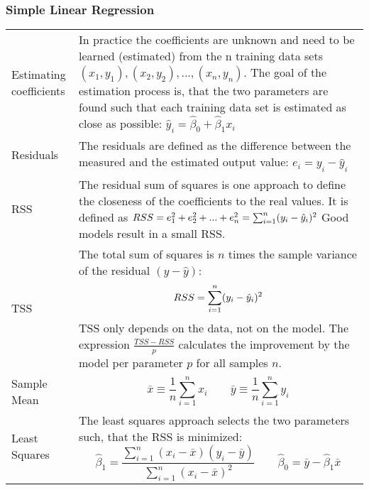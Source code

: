\subsubsection{Simple Linear Regression}
\begin{onehalfspace}
	\begin{tabularx}{\textwidth}{p{3cm}X}
		Estimating coefficients & In practice the coefficients are unknown and need to be learned (estimated) from the n training data sets \( (x_1,y_1), (x_2,y_2),..., (x_n,y_n) \). The goal of the estimation process is, that the two parameters are found such that each training data set is estimated as close as possible:
		\( \hat{y}_i = \hat{\beta}_0+\hat{\beta}_1 x_i \) \\
		Residuals & The residuals are defined as the difference between the measured and the estimated output value:
		\( e_i = y_i-\hat{y}_i \) \\
		RSS & The residual sum of squares is one approach to define the closeness of the coefficients to the real values. It	is defined as \( RSS = e^2_1+e^2_2+...+e^2_n = \sum_{i=1}^{n} (y_i-\hat{y}_i)^2\)
		Good models result in a small RSS. \\
		TSS & The total sum of squares is $n$ times the sample variance of the residual $(y-\hat{y})$:
		\[ RSS=\sum_{i=1}^{n} (y_i-\hat{y}_i)^2 \] TSS only depends on the data, not on the model.
		The expression $\frac{TSS-RSS}{p}$ calculates the improvement by the model per parameter $p$ for all samples $n$. \\
		Sample Mean & \[ \bar{x} \equiv{} \frac{1}{n} \sum_{i=1}^{n} x_i  \qquad
		\bar{y} \equiv{} \frac{1}{n} \sum_{i=1}^{n} y_i \] \\
		Least Squares & The least squares approach selects the two parameters such, that the RSS is minimized:
		\[ \hat{\beta}_1 = \frac{\sum_{i=1}^{n} (x_i-\bar{x})(y_i-\bar{y})}{\sum_{i=1}^{n} (x_i-\bar{x})^2}  \qquad
		\hat{\beta}_0 = \bar{y}-\hat{\beta}_1 \bar{x} \] \\
	\end{tabularx}
\end{onehalfspace}

